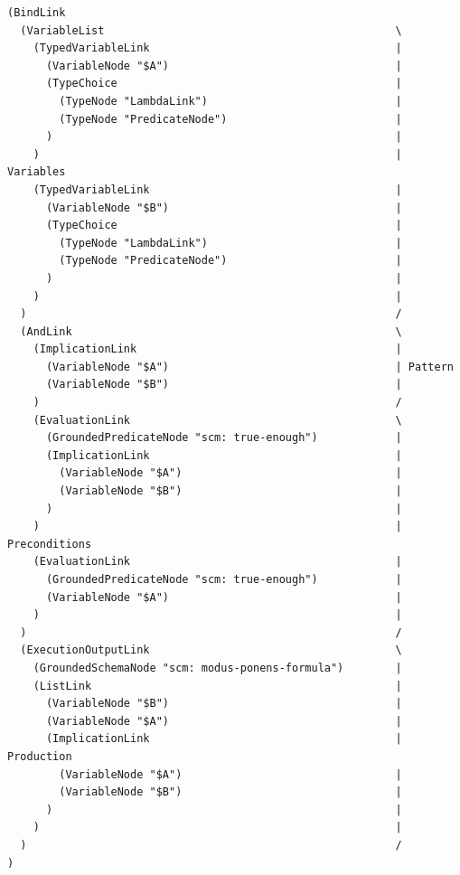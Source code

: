 \documentclass{beamer}
\begin{document}
\begin{frame}[fragile]
\begin{columns}
\begin{onlyenv}
{\TINY
\begin{verbatim}
(BindLink
  (VariableList                                             \
    (TypedVariableLink                                      |
      (VariableNode "$A")                                   |
      (TypeChoice                                           |
        (TypeNode "LambdaLink")                             |
        (TypeNode "PredicateNode")                          |
      )                                                     |
    )                                                       | Variables
    (TypedVariableLink                                      |
      (VariableNode "$B")                                   |
      (TypeChoice                                           |
        (TypeNode "LambdaLink")                             |
        (TypeNode "PredicateNode")                          |
      )                                                     |
    )                                                       |
  )                                                         /
  (AndLink                                                  \
    (ImplicationLink                                        |
      (VariableNode "$A")                                   | Pattern
      (VariableNode "$B")                                   |
    )                                                       /
    (EvaluationLink                                         \
      (GroundedPredicateNode "scm: true-enough")            |
      (ImplicationLink                                      |
        (VariableNode "$A")                                 |
        (VariableNode "$B")                                 |
      )                                                     |
    )                                                       | Preconditions
    (EvaluationLink                                         |
      (GroundedPredicateNode "scm: true-enough")            |
      (VariableNode "$A")                                   |
    )                                                       |
  )                                                         /
  (ExecutionOutputLink                                      \
    (GroundedSchemaNode "scm: modus-ponens-formula")        |
    (ListLink                                               |
      (VariableNode "$B")                                   |
      (VariableNode "$A")                                   |
      (ImplicationLink                                      | Production
        (VariableNode "$A")                                 |
        (VariableNode "$B")                                 |
      )                                                     |
    )                                                       |
  )                                                         /
)
\end{verbatim}
}


\end{onlyenv}
\end{columns}
\end{frame}
\end{document}
